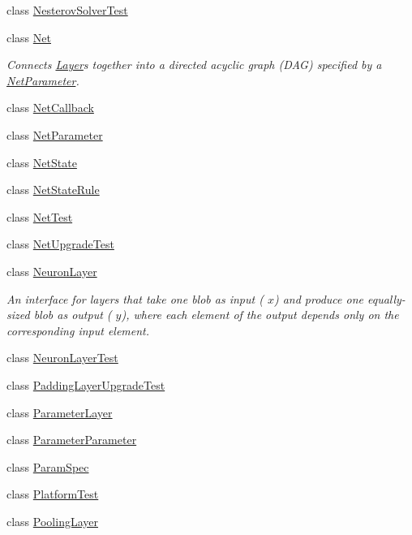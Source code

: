 \begin{DoxyCompactItemize}
\item 
class \mbox{\hyperlink{classcaffe_1_1_nesterov_solver_test}{Nesterov\+Solver\+Test}}
\item 
class \mbox{\hyperlink{classcaffe_1_1_net}{Net}}
\begin{DoxyCompactList}\small\item\em Connects \mbox{\hyperlink{classcaffe_1_1_layer}{Layer}}s together into a directed acyclic graph (D\+AG) specified by a \mbox{\hyperlink{classcaffe_1_1_net_parameter}{Net\+Parameter}}. \end{DoxyCompactList}\item 
class \mbox{\hyperlink{classcaffe_1_1_net_callback}{Net\+Callback}}
\item 
class \mbox{\hyperlink{classcaffe_1_1_net_parameter}{Net\+Parameter}}
\item 
class \mbox{\hyperlink{classcaffe_1_1_net_state}{Net\+State}}
\item 
class \mbox{\hyperlink{classcaffe_1_1_net_state_rule}{Net\+State\+Rule}}
\item 
class \mbox{\hyperlink{classcaffe_1_1_net_test}{Net\+Test}}
\item 
class \mbox{\hyperlink{classcaffe_1_1_net_upgrade_test}{Net\+Upgrade\+Test}}
\item 
class \mbox{\hyperlink{classcaffe_1_1_neuron_layer}{Neuron\+Layer}}
\begin{DoxyCompactList}\small\item\em An interface for layers that take one blob as input ( $ x $) and produce one equally-\/sized blob as output ( $ y $), where each element of the output depends only on the corresponding input element. \end{DoxyCompactList}\item 
class \mbox{\hyperlink{classcaffe_1_1_neuron_layer_test}{Neuron\+Layer\+Test}}
\item 
class \mbox{\hyperlink{classcaffe_1_1_padding_layer_upgrade_test}{Padding\+Layer\+Upgrade\+Test}}
\item 
class \mbox{\hyperlink{classcaffe_1_1_parameter_layer}{Parameter\+Layer}}
\item 
class \mbox{\hyperlink{classcaffe_1_1_parameter_parameter}{Parameter\+Parameter}}
\item 
class \mbox{\hyperlink{classcaffe_1_1_param_spec}{Param\+Spec}}
\item 
class \mbox{\hyperlink{classcaffe_1_1_platform_test}{Platform\+Test}}
\item 
class \mbox{\hyperlink{classcaffe_1_1_pooling_layer}{Pooling\+Layer}}

\end{DoxyCompactItemize}
